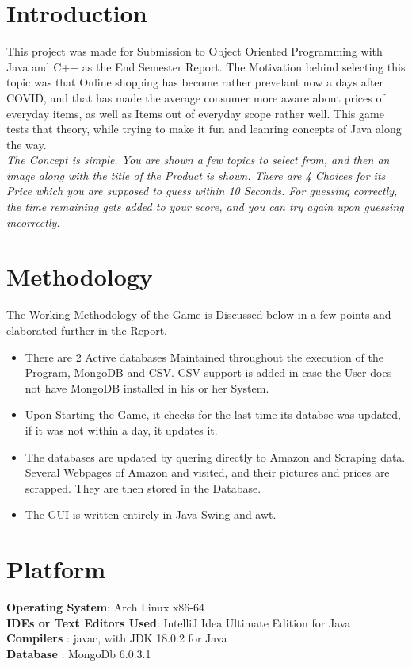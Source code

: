 \documentclass[11pt]{article}
\begin{document}
\tableofcontents
\thispagestyle{empty}
\clearpage

\setcounter{page}{1}

\section{Introduction}
This project was made for Submission to Object Oriented Programming with Java and C++ as the End Semester Report. The Motivation behind selecting this topic was that Online shopping has become rather prevelant now a days after COVID, and that has made the average consumer more aware about prices of everyday items, as well as Items out of everyday scope rather well. This game tests that theory, while trying to make it fun and leanring concepts of Java along the way. \\

\textit{The Concept is simple. You are shown a few topics to select from, and then an image along with the title of the Product is shown. There are 4 Choices for its Price which you are supposed to guess within 10 Seconds. For guessing correctly, the time remaining gets added to your score, and you can try again upon guessing incorrectly.}

\section{Methodology}
The Working Methodology of the Game is Discussed below in a few points and elaborated further in the Report. 
\begin{itemize}
	\item There are 2 Active databases Maintained throughout the execution of the Program, MongoDB and CSV. CSV support is added in case the User does not have MongoDB installed in his or her System. 
	\item Upon Starting the Game, it checks for the last time its databse was updated, if it was not within a day, it updates it. 
	\item The databases are updated by quering directly to Amazon and Scraping data. Several Webpages of Amazon and visited, and their pictures and prices are scrapped. They are then stored in the Database. 
	\item The GUI is written entirely in Java Swing and awt. 
\end{itemize}
\section{Platform}
\textbf{Operating System}: Arch Linux x86-64 \\
\textbf{IDEs or Text Editors Used}: IntelliJ Idea Ultimate Edition for Java\\
\textbf{Compilers} : javac, with JDK 18.0.2 for Java\\
\textbf{Database} : MongoDb 6.0.3.1
\end{document}
